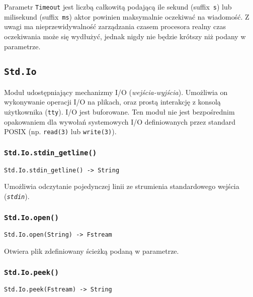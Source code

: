 Parametr \texttt{Timeout} jest liczbą całkowitą podającą ile sekund
(suffix~\texttt{s}) lub milisekund (suffix~\texttt{ms}) aktor powinien
maksymalnie oczekiwać na wiadomość. Z uwagi ma nieprzewidywalność zarządzania
czasem procesora realny czas oczekiwania może się wydłużyć, jednak nigdy nie
będzie krótszy niż podany w parametrze.

\subsection{\texttt{Std.Io}}
\label{stdlib_Std_Io}

Moduł udostępniający mechanizmy I/O (\emph{wejścia-wyjścia}).
Umożliwia on wykonywanie operacji I/O na plikach, oraz prostą interakcję z
konsolą użytkownika (\texttt{tty}). I/O jest buforowane. Ten moduł nie jest
bezpośrednim opakowaniem dla wywołań systemowych I/O definiowanych przez
standard POSIX (np. \texttt{read(3)} lub \texttt{write(3)}).

\subsubsection{\texttt{Std.Io.stdin\_getline()}}

\begin{small}
\begin{lstlisting}
Std.Io.stdin_getline() -> String
\end{lstlisting}
\end{small}

Umożliwia odczytanie pojedynczej linii ze strumienia standardowego wejścia (\emph{\texttt{stdin}}).

\subsubsection{\texttt{Std.Io.open()}}

\begin{small}
\begin{lstlisting}
Std.Io.open(String) -> Fstream
\end{lstlisting}
\end{small}

Otwiera plik zdefiniowany ścieżką podaną w parametrze.

\subsubsection{\texttt{Std.Io.peek()}}

\begin{small}
\begin{lstlisting}
Std.Io.peek(Fstream) -> String
\end{lstlisting}
\end{small}

